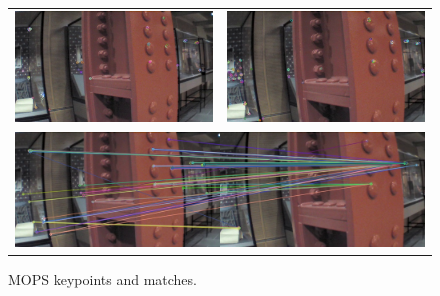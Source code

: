 \documentclass{acmsiggraph}
\begin{document}
\begin{figure}[h]
  \centering
  \begin{tabular}{cc}
    \includegraphics[resolution=150, scale=0.75]{images/mops-kp1} &
    \includegraphics[resolution=150, scale=0.75]{images/mops-kp2} \\
    \multicolumn{2}{c}{\includegraphics[resolution=150, scale=0.77]{images/mops-matches}}
  \end{tabular}
  \caption{MOPS keypoints and matches.}
  \label{fig:mops-ex}
\end{figure}
\end{document}
